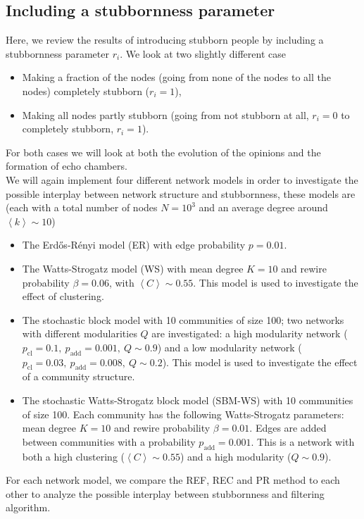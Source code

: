 \documentclass[11 pt , letterpaper , twoside , openright]{book}
\begin{document}
\subsection{Including a stubbornness parameter}
\label{stubbpar}
Here, we review the results of introducing stubborn people by including a stubbornness parameter $r_i$. We look at two slightly different case
\begin{itemize}
	\item Making a fraction of the nodes (going from none of the nodes to all the nodes) completely stubborn ($r_i = 1$),
	\item Making all nodes partly stubborn (going from not stubborn at all, $r_i = 0$ to completely stubborn, $r_i = 1$).
\end{itemize}
For both cases we will look at both the evolution of the opinions and the formation of echo chambers. \\
We will again implement four different network models in order to investigate the possible interplay between network structure and stubbornness, these models are (each with a total number of nodes $N = 10^3$ and an average degree around $\left<k\right> \sim 10$)
\begin{itemize}
	\item The Erd\H{o}s-R\'{e}nyi model (ER) with edge probability $p = 0.01$.
	\item The Watts-Strogatz model (WS) with mean degree $K=10$ and rewire probability $\beta = 0.06$, with $\left<C\right> \sim 0.55$. This model is used to investigate the effect of clustering.
	\item The stochastic block model with 10 communities of size 100; two networks with different modularities $Q$ are investigated: a high modularity network ($p_{\text{cl}} = 0.1,\ p_{\text{add}} = 0.001,\ Q \sim 0.9$) and a low modularity network ($p_{\text{cl}} = 0.03,\ p_{\text{add}} = 0.008,\ Q \sim 0.2$). This model is used to investigate the effect of a community structure.
	\item The stochastic Watts-Strogatz block model (SBM-WS) with 10 communities of size 100. Each community has the following Watts-Strogatz parameters: mean degree $K =10$ and rewire probability $\beta = 0.01$. Edges are added between communities with a probability $p_{\text{add}} = 0.001$. This is a network with both a high clustering ($\left<C\right> \sim 0.55$) and a high modularity ($Q \sim 0.9$).
\end{itemize}
For each network model, we compare the REF, REC and PR method to each other to analyze the possible interplay between stubbornness and filtering algorithm.\\
\end{document}
